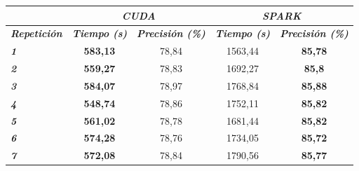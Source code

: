 \begin{table}[ht]
\begin{tabular}{@{}l|cc|cc|@{}}
                             & \multicolumn{2}{c|}{\textit{\textbf{CUDA}}}                                                              & \multicolumn{2}{c|}{\textit{\textbf{SPARK}}}                                                             \\ \midrule
\textit{\textbf{Repetición}} & \multicolumn{1}{l}{\textit{\textbf{Tiempo (s)}}} & \multicolumn{1}{l|}{\textit{\textbf{Precisión (\%)}}} & \multicolumn{1}{l}{\textit{\textbf{Tiempo (s)}}} & \multicolumn{1}{l|}{\textit{\textbf{Precisión (\%)}}} \\ \midrule
\textit{\textbf{1}}          & \textbf{583,13}                                  & 78,84                                                 & 1563,44                                          & \textbf{85,78}                                        \\
\textit{\textbf{2}}          & \textbf{559,27}                                  & 78,83                                                 & 1692,27                                          & \textbf{85,8}                                         \\
\textit{\textbf{3}}          & \textbf{584,07}                                  & 78,97                                                 & 1768,84                                          & \textbf{85,88}                                        \\
\textit{\textbf{4}}          & \textbf{548,74}                                  & 78,86                                                 & 1752,11                                          & \textbf{85,82}                                        \\
\textit{\textbf{5}}          & \textbf{561,02}                                  & 78,78                                                 & 1681,44                                          & \textbf{85,82}                                        \\
\textit{\textbf{6}}          & \textbf{574,28}                                  & 78,76                                                 & 1734,05                                          & \textbf{85,72}                                        \\
\textit{\textbf{7}}          & \textbf{572,08}                                  & 78,84                                                 & 1790,56                                          & \textbf{85,77}                                        \\

\end{tabular}
\end{table}
